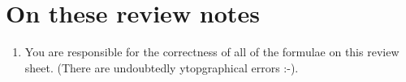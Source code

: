 \documentclass[12pt]{article}
\begin{document}
\section*{On these review notes}
\begin{enumerate}[1.]
\item You are responsible for the correctness of all of the formulae
  on this review sheet. (There are undoubtedly ytopgraphical errors :-).
\end{enumerate}

\newpage
\end{document}
